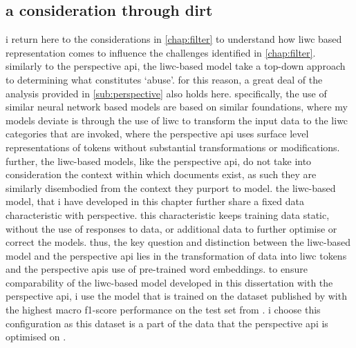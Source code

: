 
\subsection{a consideration through dirt}\label{sub:liwc_model}

i return here to the considerations in \cref{chap:filter} to understand how liwc based representation comes to influence the challenges identified in \cref{chap:filter}.
similarly to the perspective api, the liwc-based model take a top-down approach to determining what constitutes `abuse'. for this reason, a great deal of the analysis provided in \cref{sub:perspective} also holds here.
specifically, the use of similar neural network based models are based on similar foundations, where my models deviate is through the use of liwc \cite{pennebaker:2001} to transform the input data to the liwc categories that are invoked, where the perspective api uses surface level representations of tokens without substantial transformations or modifications. 
further, the liwc-based models, like the perspective api, do not take into consideration the context within which documents exist, as such they are similarly disembodied from the context they purport to model.
the liwc-based model, that i have developed in this chapter further share a fixed data characteristic with perspective.
this characteristic keeps training data static, without the use of responses to data, or additional data to further optimise or correct the models.
thus, the key question and distinction between the liwc-based model and the perspective api lies in the transformation of data into liwc tokens and the perspective apis use of pre-trained word embeddings.
to ensure comparability of the liwc-based model developed in this dissertation with the perspective api, i use the model that is trained on the dataset published by \citet{wulczyn:2017} with the highest macro f1-score performance on the test set from \citet{wulczyn:2017}.
i choose this configuration as this dataset is a part of the data that the perspective api is optimised on \citep{perspective:github}.

